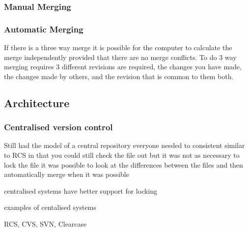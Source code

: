 \subsubsection{Manual Merging}



\subsubsection{Automatic Merging}
If there is a three way merge it is possible for the computer to calculate the merge independently provided that there are no merge conflicts.
To do 3 way merging requires 3 different revisions are required, the changes you have made, the changes made by others, and the revision that is common to them both.


% 

\subsection{Architecture}
\subsubsection{Centralised version control}
Still had the model of a central repository everyone needed to consistent
similar to RCS in that you could still check the file out but it was not as necessary to lock the file
it was possible to look at the differences between the files and then automatically merge when it was possible

centralised systems have better support for locking  

examples of centalised systems

RCS, CVS, SVN, Clearcase

